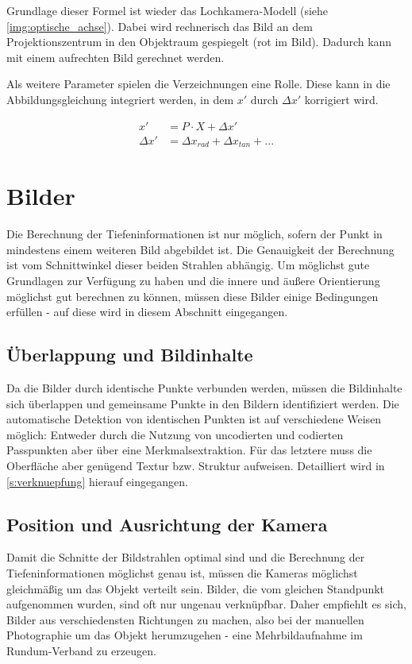 \documentclass[./00PhotoBox.tex]{subfiles}
\begin{document}
Grundlage dieser Formel ist wieder das Lochkamera-Modell (siehe \autoref{img:optische_achse}). Dabei wird rechnerisch das Bild an dem Projektionszentrum in den Objektraum gespiegelt (rot im Bild). Dadurch kann mit einem aufrechten Bild gerechnet werden.

Als weitere Parameter spielen die Verzeichnungen eine Rolle. Diese kann in die Abbildungsgleichung integriert werden, in dem $x'$ durch $\Delta x'$ korrigiert wird. \citep[S. 277]{luhmann}

\begin{align}
    \label{abbildungsgleichung_verzerrung}
    x'        & = P \cdot X + \Delta x'                 \\
    \Delta x' & = \Delta x_{rad} + \Delta x_{tan} + ...
\end{align}



\section{Bilder}
\label{s:bilder}

Die Berechnung der Tiefeninformationen ist nur möglich, sofern der Punkt in mindestens einem weiteren Bild abgebildet ist. Die Genauigkeit der Berechnung ist vom Schnittwinkel dieser beiden Strahlen abhängig. Um möglichst gute Grundlagen zur Ver\-fügung zu haben und die innere und äußere Orientierung möglichst gut berechnen zu können, müssen diese Bilder einige Bedingungen erfüllen - auf diese wird in diesem Abschnitt eingegangen.

\subsection{Überlappung und Bildinhalte}
Da die Bilder durch identische Punkte verbunden werden, müssen die Bildinhalte sich überlappen und gemeinsame Punkte in den Bildern identifiziert werden. Die automatische Detektion von identischen Punkten ist auf verschiedene Weisen möglich: Entweder durch die Nutzung von uncodierten und codierten Passpunkten aber über eine Merkmalsextraktion. Für das letztere muss die Oberfläche aber genügend Textur bzw. Struktur aufweisen. Detailliert wird in \autoref{s:verknuepfung} hierauf eingegangen. \citep[S. 478]{luhmann}

\subsection{Position und Ausrichtung der Kamera}
Damit die Schnitte der Bildstrahlen optimal sind und die Berechnung der Tiefeninformationen möglichst genau ist, müssen die Kameras möglichst gleichmäßig um das Objekt verteilt sein.
Bilder, die vom gleichen Standpunkt aufgenommen wurden, sind oft nur ungenau verknüpfbar. Daher empfiehlt es sich, Bilder aus verschiedensten Richtungen zu machen, also bei der manuellen Photographie um das Objekt herumzugehen - eine Mehrbildaufnahme im Rundum-Verband zu erzeugen. \citep[S. 170]{luhmann}
\end{document}
